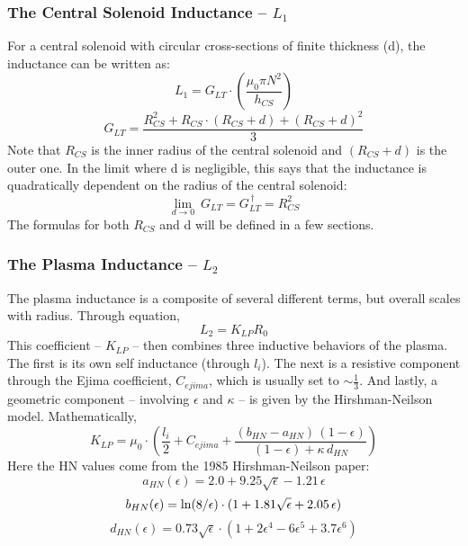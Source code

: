 \subsubsection{The Central Solenoid Inductance -- $L_1$}

For a central solenoid with circular cross-sections of finite thickness (d), the inductance can be written as: \cite{hartmann}
\begin{equation}
	L_1 = G_{LT} \cdot \left( \frac{\mu_0 \pi N^2}{h_{CS}} \right)
\end{equation}
\begin{equation}
	G_{LT} = \frac{R_{CS}^2 + R_{CS} \cdot ( R_{CS} + d ) + ( R_{CS} + d ) ^ 2 }{3}
\end{equation}
Note that $R_{CS}$ is the inner radius of the central solenoid and $( R_{CS} + d )$ is the outer one. In the limit where d is negligible, this says that the inductance is quadratically dependent on the radius of the central solenoid:
\begin{equation}
	\label{eq:glt_simple}
	\underset{d \to 0}{\lim} \ G_{LT} = G_{LT}^{\,\dagger} = R_{CS}^2
\end{equation}
The formulas for both $R_{CS}$ and d will be defined in a few sections.

\subsubsection{The Plasma Inductance -- $L_2$}

The plasma inductance is a composite of several different terms, but overall scales with radius. Through equation,
\begin{equation}
	L_2 = K_{LP} R_0
\end{equation}
This  coefficient -- $K_{LP}$ -- then combines three inductive behaviors of the plasma. The first is its own self inductance (through $l_i$). \cite{jeff} The next is a resistive component through the Ejima coefficient, $C_{ejima}$, which is usually set to $\sim \frac{1}{3}$. \cite{process} And lastly, a geometric component -- involving $\epsilon$ and $\kappa$ -- is given by the Hirshman-Neilson model. \cite{hn85} Mathematically,
\begin{equation}
	K_{LP} = \mu_0 \cdot \left( \frac{l_i}{2} + C_{ejima} + \frac{ ( b_{HN} - a_{HN} ) \, ( 1 - \epsilon ) }{ ( 1 - \epsilon ) + \kappa \, d_{HN} } \right)
\end{equation}
Here the HN values come from the 1985 Hirshman-Neilson paper:
\begin{equation}
	a_{HN}(\epsilon) = 2.0 + 9.25 \sqrt{\epsilon} - 1.21 \, \epsilon
\end{equation}
\begin{equation}
	b_{HN}(\epsilon) = \textnormal{ln} (8/\epsilon) \cdot ( 1 + 1.81 \sqrt{\epsilon} + 2.05 \, \epsilon )
\end{equation}
\begin{equation}
	d_{HN}(\epsilon) = 0.73 \sqrt{\epsilon}  \cdot ( 1 + 2 \epsilon^4 - 6 \epsilon^5 +3.7 \epsilon^6 )
\end{equation}

